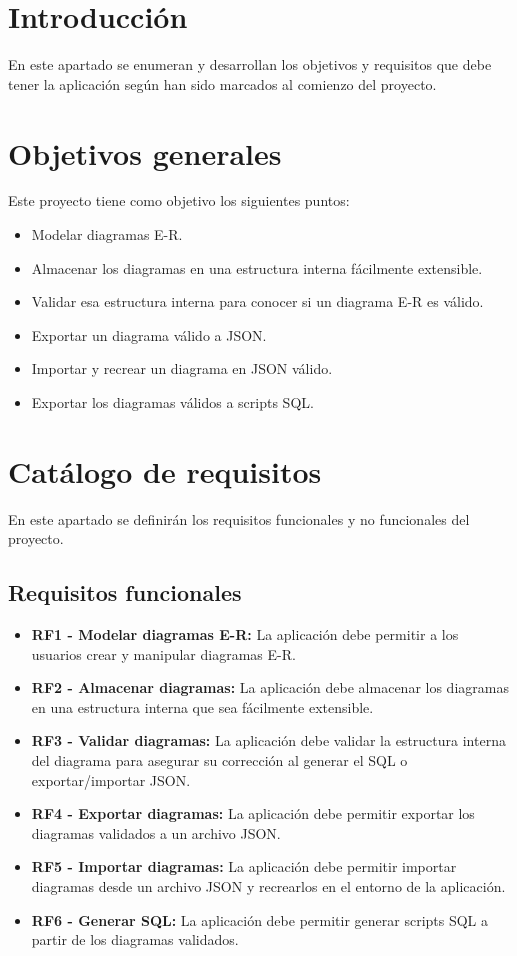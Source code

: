 
\section{Introducción}
En este apartado se enumeran y desarrollan los objetivos y requisitos que debe tener la aplicación según han sido marcados al comienzo del proyecto.

\section{Objetivos generales}
Este proyecto tiene como objetivo los siguientes puntos:
\begin{itemize}
\tightlist
\item Modelar diagramas E-R.
\item Almacenar los diagramas en una estructura interna fácilmente extensible.
\item Validar esa estructura interna para conocer si un diagrama E-R es válido.
\item Exportar un diagrama válido a JSON.
\item Importar y recrear un diagrama en JSON válido.
\item Exportar los diagramas válidos a scripts SQL.
\end{itemize}
\newpage

\section{Catálogo de requisitos}
En este apartado se definirán los requisitos funcionales y no funcionales del proyecto.

\subsection{Requisitos funcionales}
\begin{itemize}
\tightlist
\item \textbf{RF1 - Modelar diagramas E-R:} La aplicación debe permitir a los usuarios crear y manipular diagramas E-R.
\item \textbf{RF2 - Almacenar diagramas:} La aplicación debe almacenar los diagramas en una estructura interna que sea fácilmente extensible.
\item \textbf{RF3 - Validar diagramas:} La aplicación debe validar la estructura interna del diagrama para asegurar su corrección al generar el SQL o exportar/importar JSON.
\item \textbf{RF4 - Exportar diagramas:} La aplicación debe permitir exportar los diagramas validados a un archivo JSON.
\item \textbf{RF5 - Importar diagramas:} La aplicación debe permitir importar diagramas desde un archivo JSON y recrearlos en el entorno de la aplicación.
\item \textbf{RF6 - Generar SQL:} La aplicación debe permitir generar scripts SQL a partir de los diagramas validados.
\end{itemize}

